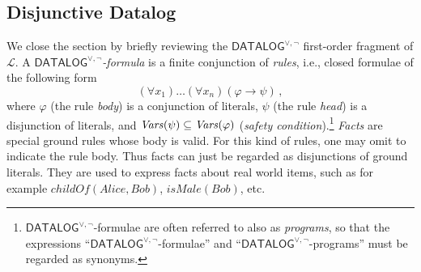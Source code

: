 \documentclass[a4paper]{llncs}
\newcommand{\DisjDatalog}{\ensuremath{\mathsf{DATALOG}^{\vee,\neg}}\xspace}
\newcommand{\Lang}{\ensuremath{\mathcal{L}\xspace}} %
\newcommand{\hinter}{\ensuremath{\mathcal{H}}}
\begin{document}
\subsection{Disjunctive Datalog}

We close the section by briefly reviewing the \DisjDatalog first-order
fragment of $\Lang$.  A \emph{\DisjDatalog-formula} is a finite
conjunction of \emph{rules}, i.e., closed formulae of the following
form
\[
  (\forall x_1)\ldots(\forall x_n)(\varphi \rightarrow \psi)\,, \]
%
where $\varphi$ (the rule \emph{body}) is a conjunction of literals,
$\psi$ (the rule \emph{head}) is a disjunction of literals, and
$\mathit{Vars}(\psi) \subseteq \mathit{Vars}(\varphi)$ (\emph{safety 
condition}).\footnote{$\DisjDatalog$-formulae are often referred to
also as \emph{programs}, so that the expressions
``\DisjDatalog-formulae'' and ``\DisjDatalog-programs'' must be
regarded as synonyms.}
%
\emph{Facts} are special ground rules whose body is valid.  For
this kind of rules, one may omit to indicate the rule body.  Thus
facts can just be regarded as disjunctions of ground literals.  They
are used to express facts about real world items, such as for example
$\mathit{childOf}(\mathit{Alice}, \mathit{Bob})$, 
$\mathit{isMale}(\mathit{Bob})$, etc.
\end{document}
